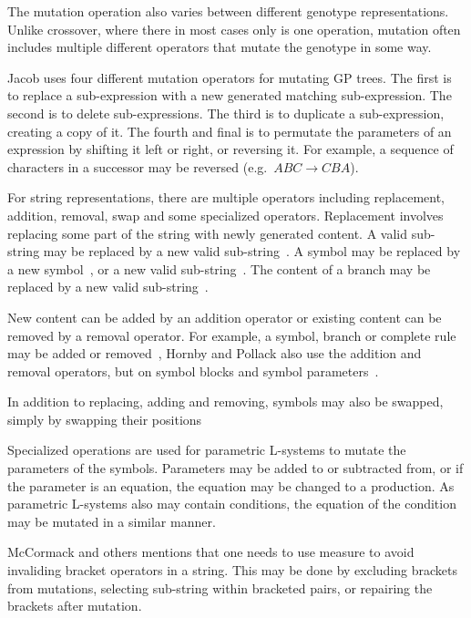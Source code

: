 The mutation operation also varies between different genotype representations.
Unlike crossover, where there in most cases only is one operation, mutation often includes multiple different operators that mutate the genotype in some way.

Jacob uses four different mutation operators for mutating GP trees.
The first is to replace a sub-expression with a new generated matching sub-expression.
The second is to delete sub-expressions.
The third is to duplicate a sub-expression, creating a copy of it.
The fourth and final is to permutate the parameters of an expression by shifting it left or right, or reversing it.
For example, a sequence of characters in a successor may be reversed (e.g.\ $ABC \rightarrow CBA$).~\cite{1994Jacob, 1995Jacob}

For string representations, there are multiple operators including replacement, addition, removal, swap and some specialized operators.
Replacement involves replacing some part of the string with newly generated content.
A valid sub-string may be replaced by a new valid sub-string~\cite{1998Mock, 2009Corchado}.
A symbol may be replaced by a new symbol~\cite{2001Hornby, 2002Ebner, 2003Ebner, 2009Corchado, 2013Ding}, or a new valid sub-string~\cite{1998Ochoa}.
The content of a branch may be replaced by a new valid sub-string~\cite{1998Ochoa}.

New content can be added by an addition operator or existing content can be removed by a removal operator.
For example, a symbol, branch or complete rule may be added or removed~\cite{2002Ebner, 2003Ebner},
Hornby and Pollack also use the addition and removal operators, but on symbol blocks and symbol parameters~\cite{2001Hornby}.

In addition to replacing, adding and removing, symbols may also be swapped, simply by swapping their positions~\cite{2002Ebner, 2003Ebner}

Specialized operations are used for parametric L-systems to mutate the parameters of the symbols.
Parameters may be added to or subtracted from, or if the parameter is an equation, the equation may be changed to a production.
As parametric L-systems also may contain conditions, the equation of the condition may be mutated in a similar manner.~\cite{2001Hornby}

McCormack and others mentions that one needs to use measure to avoid invaliding bracket operators in a string.
This may be done by excluding brackets from mutations, selecting sub-string within bracketed pairs, or repairing the brackets after mutation.~\cite{2004McCormack}
